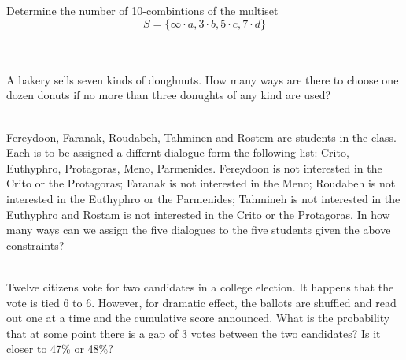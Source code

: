 \documentclass[12pt,letterpaper,boxed]{hmcpset}
\begin{document}
\begin{problem}[Shahriari 8.2.1][20]

Determine the number of 10-combintions of the multiset
$$S = \{ \infty \cdot a, 3 \cdot b, 5 \cdot c, 7 \cdot d \}$$
\
\end{problem}
\begin{problem}[Shahriari 8.2.3][20]
\\
A bakery sells seven kinds of doughnuts. How many ways are there to choose one dozen donuts if no more than three donughts of any kind are used?
\
\end{problem}
\begin{problem}[Shahriari 8.3.10][20]
\\
Fereydoon, Faranak, Roudabeh, Tahminen and Rostem are students in the class. Each is to be assigned a differnt dialogue form the following list: Crito, Euthyphro, Protagoras, Meno, Parmenides. Fereydoon is not interested in the Crito or the Protagoras; Faranak is not interested in the Meno; Roudabeh is not interested in the Euthyphro or the Parmenides; Tahmineh is not interested in the Euthyphro and Rostam is not interested in the Crito or the Protagoras. In how many ways can we assign the five dialogues to the five students given the above constraints?
\
\end{problem}
\begin{problem}[Shahriari 8.X.1][20]
\\
 Twelve citizens vote for two candidates in a college election. It happens that the vote
is tied 6 to 6. However, for dramatic effect, the ballots are shuffled and read out one at a time
and the cumulative score announced. What is the probability that at some point there is a
gap of 3 votes between the two candidates? Is it closer to 47\% or 48\%?
\
\end{problem}
\end{document}
